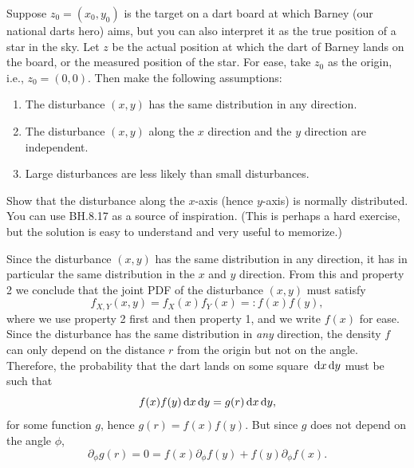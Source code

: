 \documentclass[lectures]{subfiles}
\begin{document}
\begin{exercise}\label{ex:1}
Suppose $z_0=(x_0,y_{0})$ is the target on a dart board at which Barney (our national darts hero) aims, but you can also interpret it as the true position of a star in the sky.
Let $z$ be the actual position at which the dart of Barney lands on the board, or the measured position of the star.
For ease, take $z_0$ as the origin, i.e., $z_0=(0,0)$.
Then make the following assumptions:
\begin{enumerate}
\item The disturbance $(x,y)$ has the same distribution in any direction.
\item The disturbance $(x,y)$ along the $x$ direction and the $y$ direction are independent.
\item Large disturbances are less likely than small disturbances.
\end{enumerate}
Show that the disturbance along the $x$-axis (hence $y$-axis) is normally distributed. You can use BH.8.17 as a source of inspiration. (This is perhaps a hard exercise, but  the solution is easy to understand and very useful to memorize.)

\begin{solution}
Since the disturbance $(x,y)$ has the same distribution in any direction, it has in particular the same distribution in the $x$ and $y$ direction.
From this and property 2 we conclude that the joint PDF of the disturbance $(x,y)$ must satisfy
\begin{equation}
  \label{eq:1}
  f_{X,Y}(x,y) = f_X(x)f_Y(x) =: f(x)f(y),
\end{equation}
where we use property 2 first and then property 1, and we write $f(x)$ for ease.
Since the disturbance has the same distribution in \textit{any} direction, the density $f$ can only depend on the distance $r$ from the origin but not on the angle. Therefore, the probability that the dart lands on some square $\,\textrm{d}x\,\textrm{d}y$ must be such that
\begin{equation}
  \label{eq:4}
  f(x)f(y) \,\textrm{d}x \,\textrm{d}y = g(r) \,\textrm{d}x \,\textrm{d}y,
\end{equation}
for some function $g$, hence $g(r) = f(x)f(y)$. But since $g$ does not depend on the angle $\phi$,
\begin{equation}
\label{eq:5}
\partial_{\phi} g(r) = 0 = f(x) \partial_{\phi}f(y) + f(y) \partial_{\phi}f(x).
\end{equation}


\end{solution}
\end{exercise}
\end{document}
